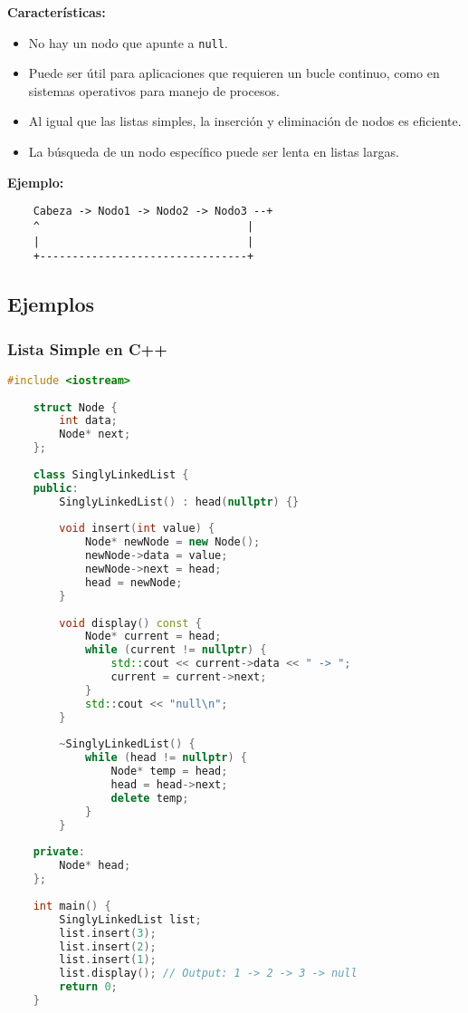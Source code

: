     \textbf{Características:}
    \begin{itemize}
        \item No hay un nodo que apunte a \texttt{null}.
        \item Puede ser útil para aplicaciones que requieren un bucle continuo, como en sistemas operativos para manejo de procesos.
        \item Al igual que las listas simples, la inserción y eliminación de nodos es eficiente.
        \item La búsqueda de un nodo específico puede ser lenta en listas largas.
    \end{itemize}
    
    \textbf{Ejemplo:}
    \begin{verbatim}
    Cabeza -> Nodo1 -> Nodo2 -> Nodo3 --+
    ^                                |
    |                                |
    +--------------------------------+
    \end{verbatim}
    
    \subsection{Ejemplos}
    
    \subsubsection{Lista Simple en C++}
    
    \begin{lstlisting}[language=C++]
    #include <iostream>
    
    struct Node {
        int data;
        Node* next;
    };
    
    class SinglyLinkedList {
    public:
        SinglyLinkedList() : head(nullptr) {}
        
        void insert(int value) {
            Node* newNode = new Node();
            newNode->data = value;
            newNode->next = head;
            head = newNode;
        }
        
        void display() const {
            Node* current = head;
            while (current != nullptr) {
                std::cout << current->data << " -> ";
                current = current->next;
            }
            std::cout << "null\n";
        }
    
        ~SinglyLinkedList() {
            while (head != nullptr) {
                Node* temp = head;
                head = head->next;
                delete temp;
            }
        }
    
    private:
        Node* head;
    };
    
    int main() {
        SinglyLinkedList list;
        list.insert(3);
        list.insert(2);
        list.insert(1);
        list.display(); // Output: 1 -> 2 -> 3 -> null
        return 0;
    }
    \end{lstlisting}
    
